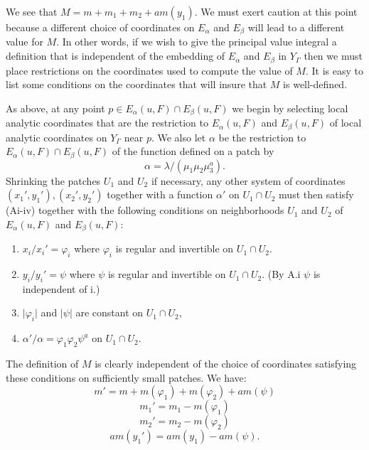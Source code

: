 \documentclass{memo-l}
\theoremstyle{definition}
\theoremstyle{remark}
\numberwithin{section}{chapter}
\numberwithin{equation}{chapter}
\begin{document}
\medskip
   We see that $M  =  m+m_{1}+m_{2}+am(y_{1})$.  We must exert caution at
this point because a different choice of coordinates on $E_{{\alpha}}$ and
$E_{{\beta}}$ will lead to a different value for $M$.  In other words, if
we wish to give the principal value integral a definition that is
independent of the embedding of $E_{{\alpha}}$ and $E_{{\beta}}$ in
$Y_{{\Gamma}}$ then we must place restrictions on the coordinates used to
compute the value of $M$.  It is easy to list some conditions on the
coordinates that will insure that $M$ is well-defined.
 

   As above, at any point $p \in E_{{\alpha}}(u,F) \cap
E_{{\beta}}(u,F)$ we begin by selecting local analytic coordinates that are
the restriction to $E_{{\alpha}}(u,F)$ and $E_{{\beta}}(u,F)$ of local
analytic coordinates on $Y_{{\Gamma}}$ near $p$.  We also let ${\alpha}$ be
the restriction to $E_{{\alpha}}(u,F) \cap E_{{\beta}}(u,F)$ of the
function defined on a patch by
$$
{\alpha}  =  {\lambda}/({\mu}_{1}{\mu}_{2}{\mu}_{3}^{a}) .
$$
Shrinking the patches $U_{1}$ and $U_{2}$ if necessary, any other system of
coordinates $(x_{1}',y_{1}'), (x_{2}',y_{2}')$ together with a function
${\alpha}'$ on $U_{1} \cap U_{2}$ must then satisfy (Ai-iv) together with
the following conditions on neighborhoods $U_{1}$ and $U_{2}$ of
$E_{{\alpha}}(u,F)$ and $E_{{\beta}}(u,F) :$

\begin{enumerate}[label=B.\roman*)]
\item
$x_{i}/x_{i}'  =  {\varphi}_{i}$ where ${\varphi}_{i}$ is regular and
invertible on $U_{1} \cap U_{2}$.

\item
$y_{i}/y_{i}'  =  \psi$ where $\psi$ is
regular and invertible on $U_{1} \cap U_{2}$.  (By A.i $\psi$
is independent of i.)

\item
$\vert\varphi_{i}\vert$ and $\vert \psi \vert$ are
constant on $U_{1} \cap U_{2}$,

\item
${\alpha}'/{\alpha}  =  {\varphi}_{1}{\varphi}_{2}{\psi}^{a}$ on 
$U_{1} \cap U_{2}$.
\end{enumerate}


\noindent
The definition of $M$ is clearly independent of the choice of coordinates
satisfying these conditions on sufficiently small patches.  We have:
$$
m'  =  m + m({\varphi}_{1}) + m({\varphi}_{2}) + am(\psi)
$$
$$
m_{1}'  =  m_{1} - m({\varphi}_{1})
$$
$$
m_{2}'  =  m_{2} - m({\varphi}_{2})
$$
$$
am(y_{1}')  =  am(y_{1}) - am(\psi).
$$ 
\end{document}
